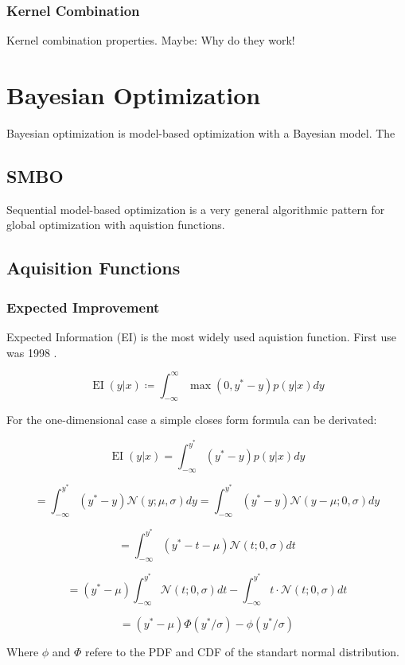 \documentclass[english]{article}
\newcommand{\EI}{\operatorname{EI}}
\newcommand{\normal}{\mathcal{N}}
\begin{document}
\subsubsection{Kernel Combination}
Kernel combination properties. Maybe: Why do they work!





\section{Bayesian Optimization}
Bayesian optimization is model-based optimization with a Bayesian model. The

\subsection{SMBO}
Sequential model-based optimization is a very general algorithmic pattern for global optimization with aquistion functions.

\subsection{Aquisition Functions}

\subsubsection{Expected Improvement}

Expected Information (EI) is the most widely used aquistion function. First use was 1998 \cite{jones_efficient_1998}.

$$ \EI(y|x) \coloneqq \int_{-\infty}^{\infty} \max(0, y^*-y)p(y|x)dy $$

For the one-dimensional case a simple closes form formula can be derivated:

$$ \EI(y|x) = \int_{-\infty}^{y^*}(y^*-y)p(y|x)dy$$

$$ = \int_{-\infty}^{y^*}(y^*-y)\normal(y; \mu, \sigma)dy =
\int_{-\infty}^{y^*}(y^*-y)\normal(y-\mu; 0, \sigma)dy$$

$$ = \int_{-\infty}^{y^*}(y^*- t - \mu)\normal(t; 0, \sigma)dt $$

$$ = (y^*-\mu)\int_{-\infty}^{y^*}\normal(t; 0, \sigma)dt - \int_{-\infty}^{y^*}t\cdot\normal(t; 0, \sigma)dt$$

$$ = (y^*-\mu)\Phi(y^*/\sigma) - \phi(y^*/\sigma) $$

Where $\phi$ and $\Phi$ refere to the PDF and CDF of the standart normal distribution.
\end{document}
